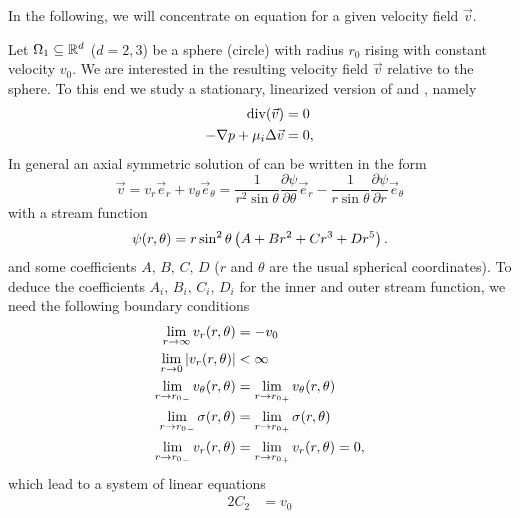 In the following, we will concentrate on equation  for a given velocity field $\vec v$.

\begin{ex}
Let $\Omega_1\subseteq\mathbb{R}^d$ ($d=2,3$) be a sphere (circle) with radius $r_0$ rising with constant velocity $v_0$. We are interested in the resulting velocity field $\vec v$ relative to the sphere. To this end we study a stationary, linearized version of  and , namely
\begin{subequations}
	\label{eq:stokes}
	\begin{align}
		\mathrm{div}\!\left(\vec v\right)&=0\\
		-\nabla p+\mu_i\Delta\vec v&=0,
	\end{align}
\end{subequations}
In general an axial symmetric solution of  can be written in the form 
\begin{equation}
	\vec v = v_r \vec e_r+v_\theta \vec e_\theta=\frac{1}{r^2\sin\theta}\frac{\partial \psi}{\partial \theta}\vec e_r-\frac{1}{r\sin\theta}\frac{\partial \psi}{\partial r}\vec e_\theta
\end{equation}
with a stream function
\begin{equation}
\psi\!\left(r,\theta\right)=r\sin^2\theta \left(A+Br^2+Cr^3+Dr^5\right). 
\end{equation}
and some coefficients $A,\,B,\,C,\,D$ ($r$ and $\theta$ are the usual spherical coordinates).
To deduce the coefficients $A_i,\,B_i,\,C_i,\,D_i$ for the inner and outer stream function, we need the following boundary conditions
\begin{subequations}
	\begin{align}
		\lim_{r\to\infty}v_r(r,\theta)&=-v_0\\
		\lim_{r\to0}\left|v_r(r,\theta)\right|&<\infty\\
		\lim_{r\to {r_0}_-}v_\theta\!\left(r,\theta\right)&=\lim_{r\to {r_0}_+}v_\theta\!\left(r,\theta\right)\\
		\lim_{r\to {r_0}_-}\sigma\!\left(r,\theta\right)&=\lim_{r\to {r_0}_+}\sigma\!\left(r,\theta\right)\\
		\lim_{r\to {r_0}_-}v_r\!\left(r,\theta\right)&=\lim_{r\to {r_0}_+}v_r\!\left(r,\theta\right)=0,
	\end{align}
\end{subequations}
which lead to a system of linear equations
\begin{subequations}
\label{eq:linsys}
	\begin{align}
		2 C_2&=v_0\\

\end{align}
\end{subequations}
\end{ex}
